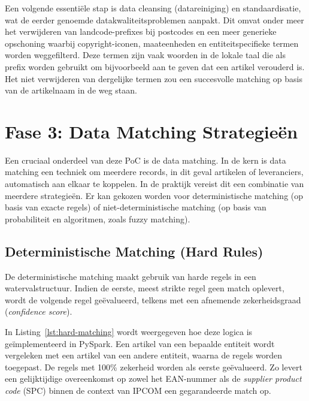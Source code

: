 Een volgende essentiële stap is data cleansing (datareiniging) en standaardisatie, wat de eerder genoemde datakwaliteitsproblemen aanpakt. Dit omvat onder meer het verwijderen van landcode-prefixes bij postcodes en een meer generieke opschoning waarbij copyright-iconen, maateenheden en entiteitspecifieke termen worden weggefilterd. Deze termen zijn vaak woorden in de lokale taal die als prefix worden gebruikt om bijvoorbeeld aan te geven dat een artikel verouderd is. Het niet verwijderen van dergelijke termen zou een succesvolle matching op basis van de artikelnaam in de weg staan.

\section{Fase 3: Data Matching Strategieën}%
\label{sec:poc-matching}


Een cruciaal onderdeel van deze PoC is de data matching. In de kern is data matching een techniek om meerdere records, in dit geval artikelen of leveranciers, automatisch aan elkaar te koppelen. In de praktijk vereist dit een combinatie van meerdere strategieën. Er kan gekozen worden voor deterministische matching (op basis van exacte regels) of niet-deterministische matching (op basis van probabiliteit en algoritmen, zoals fuzzy matching).

\subsection{Deterministische Matching (Hard Rules)}

De deterministische matching maakt gebruik van harde regels in een watervalstructuur. Indien de eerste, meest strikte regel geen match oplevert, wordt de volgende regel geëvalueerd, telkens met een afnemende zekerheidsgraad (\textit{confidence score}).

In Listing~\ref{lst:hard-matching} wordt weergegeven hoe deze logica is geïmplementeerd in PySpark. Een artikel van een bepaalde entiteit wordt vergeleken met een artikel van een andere entiteit, waarna de regels worden toegepast. De regels met 100\% zekerheid worden als eerste geëvalueerd. Zo levert een gelijktijdige overeenkomst op zowel het EAN-nummer als de \textit{supplier product code} (SPC) binnen de context van IPCOM een gegarandeerde match op.

